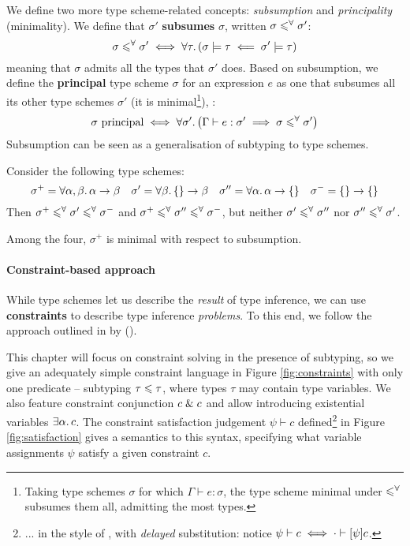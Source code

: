 We define two more type scheme-related concepts: \emph{subsumption} and \emph{principality} (minimality). We define that $\sigma'$ \textbf{subsumes} $\sigma$, written $\sigma \leqslant^\forall \sigma'$:
$$ \sigma \leqslant^\forall \sigma' \iff \forall \tau \ldotp (\sigma \models \tau \impliedby \sigma' \models \tau) $$
meaning that $\sigma$ admits all the types that $\sigma'$ does.
Based on subsumption, we define the \textbf{principal} type scheme $\sigma$ for an expression $e$ as one that subsumes all its other type schemes $\sigma'$ (it is minimal\footnote{Taking type schemes $\sigma$ for which $\Gamma \vdash e : \sigma$, the type scheme minimal under $\leqslant^\forall$ subsumes them all, admitting the most types.}), \ie{}:
$$ \sigma\text{ principal} \iff \forall \sigma' \ldotp \left( \Gamma \vdash e : \sigma' \implies \sigma \subsume \sigma' \right) $$
Subsumption can be seen as a generalisation of subtyping to type schemes.
\begin{example}
Consider the following type schemes:
$$    \sigma^+ = \forall \alpha, \beta \ldotp \alpha \to \beta
\quad \sigma' = \forall \beta \ldotp \flrec{} \to \beta 
\quad \sigma'' = \forall \alpha \ldotp \alpha \to \flrec{} 
\quad \sigma^- = \flrec{} \to \flrec{} $$
Then $\sigma^+ \leqslant^\forall \sigma' \leqslant^\forall \sigma^-$ and $\sigma^+ \leqslant^\forall \sigma'' \leqslant^\forall \sigma^-$, but neither $\sigma' \leqslant^\forall \sigma''$ nor $\sigma'' \leqslant^\forall \sigma'$. 

Among the four, $\sigma^+$ is minimal with respect to subsumption.
\end{example}

\paragraph{Constraint-based approach} While type schemes let us describe the \emph{result} of type inference, we can use \textbf{constraints} to describe type inference \emph{problems}. To this end, we follow the approach outlined in  by \textcite{essence-of-ml-type-inference} (\textcite[Chapter~10]{adv-tapl}).

This chapter will focus on constraint solving in the presence of subtyping, so we give an adequately simple constraint language in Figure \ref{fig:constraints} with only one predicate -- subtyping $\tau \leqslant \tau$, where types $\tau$ may contain type variables. We also feature constraint conjunction $c \;\&\; c$ and allow introducing existential variables $\exists \alpha \ldotp c$. The constraint satisfaction judgement $\psi \vdash c$ defined\footnote{... in the style of \textcite{constraint-based-freeze-ml}, with \emph{delayed} substitution: notice $\psi \vdash c \iff \cdot \vdash \substx \psi c$.} in Figure \ref{fig:satisfaction} gives a semantics to this syntax, specifying what variable assignments $\psi$ satisfy a given constraint $c$. 

